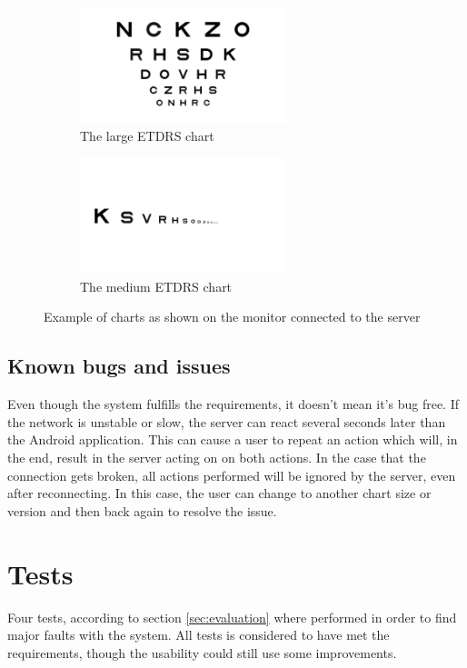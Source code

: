 \documentclass[12pt,a4paper,notitlepage]{report}
\begin{document}
\begin{figure}[ht!]
\centering
\begin{subfigure}{.5\textwidth}
  \centering
  \includegraphics[width=60mm]{images/servergui/etdrs_chart.png}
  \caption{The large ETDRS chart}
  \label{fig:server_large}
\end{subfigure}%
\begin{subfigure}{.5\textwidth}
  \centering
  \includegraphics[width=60mm]{images/servergui/etdrs_single_row.png}
  \caption{The medium ETDRS chart}
  \label{fig:server_medium}
\end{subfigure}
\caption{Example of charts as shown on the monitor connected to the server}
\label{fig:server_charts}
\end{figure}

\subsection{Known bugs and issues}
Even though the system fulfills the requirements, it doesn't mean it's bug free. If the network is unstable or slow, the server can react several seconds later than the Android application. This can cause a user to repeat an action which will, in the end, result in the server acting on on both actions. In the case that the connection gets broken, all actions performed will be ignored by the server, even after reconnecting. In this case, the user can change to another chart size or version and then back again to resolve the issue.

\section{Tests}
Four tests, according to section \ref{sec:evaluation} where performed in order to find major faults with the system. All tests is considered to have met the requirements, though the usability could still use some improvements.
\end{document}

